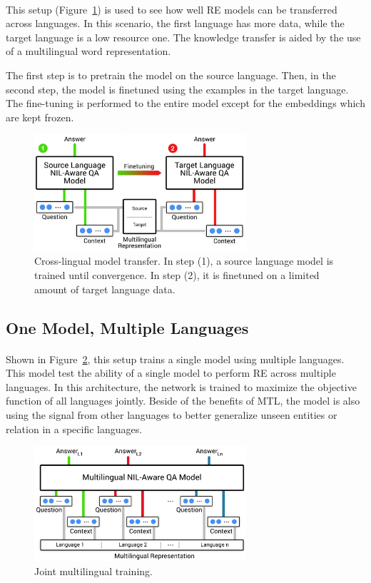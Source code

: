 \paragraph{}
This setup (Figure~\ref{fig:setupTransfer}) is used to see how well RE models can be transferred across languages. In this scenario, the first language has more data, while the target language is a low resource one. The knowledge transfer is aided by the use of a multilingual word representation.

The first step is to pretrain the model on the source language. Then, in the second step, the model is finetuned using the examples in the target language. The fine-tuning is performed to the entire model except for the embeddings which are kept frozen.

\begin{figure}[h]
    \centering
    \includegraphics[width=0.7\textwidth]{images/model_v2.pdf}
    \caption{Cross-lingual model transfer. In step (1), a source language model is trained until convergence. In step (2), it is finetuned on a limited amount of target language data.}
    \label{fig:setupTransfer}
\end{figure}%

\subsection{One Model, Multiple Languages}
\label{sec:onemodel}
\paragraph{}
Shown in Figure~\ref{fig:setupMulti}, this setup trains a single model using multiple languages. This model test the ability of a single model to perform RE across multiple languages. In this architecture, the network is trained to maximize the objective function of all languages jointly. Beside of the benefits of MTL, the model is also using the signal from other languages to better generalize unseen entities or relation in a specific languages.



\begin{figure}[h]
    \centering
     \includegraphics[width=0.7\textwidth]{images/model_joint_unique.pdf}
    \caption{Joint multilingual training.}
    \label{fig:setupMulti}
\end{figure}